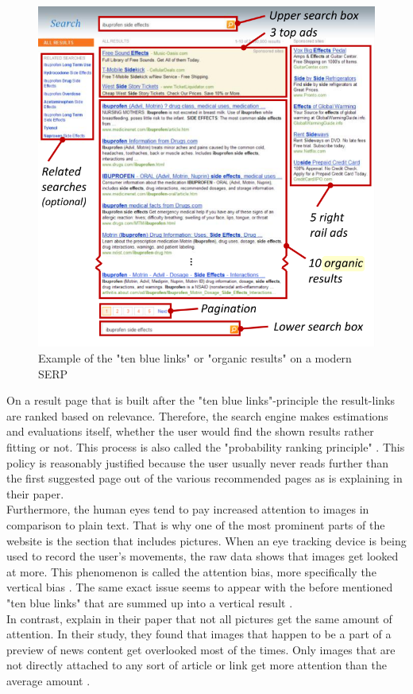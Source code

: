 \begin{figure}[!ht]
    \centering
    \includegraphics[width=1 \linewidth]{images/organic_buscher2010good.png}
    \caption{
        Example of the "ten blue links" or "organic results" on a modern SERP \autocite[44]{buscher2010good}
    }
    \label{figure:OrganicResults}
\end{figure}

On a result page that is built after the "ten blue links"-principle the result-links are ranked based on relevance. Therefore, the search engine makes estimations and evaluations itself, whether the user would find the shown results rather fitting or not. This process is also called the "probability ranking principle" \autocite{wang2016beyond}. This policy is reasonably justified because the user usually never reads further than the first suggested page out of the various recommended pages as \textcite{lewandowski2015evaluating} is explaining in their paper.\\
Furthermore, the human eyes tend to pay increased attention to images in comparison to plain text. That is why one of the most prominent parts of the website is the section that includes pictures. When an eye tracking device is being used to record the user's movements, the raw data shows that images get looked at more. This phenomenon is called the attention bias, more specifically the vertical bias \autocite{wang2016beyond}.
The same exact issue seems to appear with the before mentioned "ten blue links" that are summed up into a vertical result \autocite{wang2016beyond}.\\
In contrast, \textcite{liu2015influence} explain in their paper that not all pictures get the same amount of attention. In their study, they found that images that happen to be a part of a preview of news content get overlooked most of the times. Only images that are not directly attached to any sort of article or link get more attention than the average amount \autocite{liu2015influence}.

